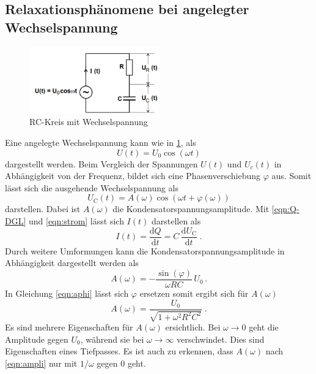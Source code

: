 \subsection{Relaxationsphänomene bei angelegter Wechselspannung}
\begin{figure}
    \centering
    \caption{RC-Kreis mit Wechselspannung} 
    \label{fig:Wechs}
    \includegraphics[width = 0.5\textwidth]{pics/wechselspannung-RC.png}
\end{figure}
Eine angelegte Wechselspannung kann wie in \ref{fig:Wechs}, als 
\begin{equation*}
    U(t)=U_0 \cos(\omega t)
\end{equation*}
dargestellt werden. Beim Vergleich der Spannungen $U(t)$ und $U_c(t)$ in Abhängigkeit von der Frequenz, bildet sich eine Phasenverschiebung $\varphi$ aus.
Somit lässt sich die ausgehende Wechselspannung als
\begin{equation}
    U_\text{C}(t)= A(\omega) \cos (\omega t + \varphi (\omega))
\end{equation}
darstellen. Dabei ist $A(\omega)$ die Kondensatorspannungsamplitude.
Mit \eqref{eqn:Q-DGL} und \eqref{eqn:strom} lässt sich $I(t)$ darstellen als
\begin{equation}
    \label{eqn:strom}
    I(t)= \frac{\text{d}Q}{\text{d}t}=C\, \frac{\text{d}U_\text{C}}{\text{d}t}\; \text{.}
\end{equation}
Durch weitere Umformungen kann die Kondensatorspannungsamplitude in Abhängigkeit dargestellt werden als 
\begin{equation}
    \label{eqn:aphi}
    A(\omega)=-\frac{\sin (\varphi)}{\omega RC}\, U_0 \, .
\end{equation}
In Gleichung \eqref{eqn:aphi} lässt sich $\varphi$ ersetzen somit ergibt sich für $A(\omega)$
\begin{equation}
    \label{eqn:ampli}
    A(\omega)=\frac{U_0}{\sqrt{1+\omega^2 R^2 C^2}} \; \text{.}
\end{equation}
Es sind mehrere Eigenschaften für $A(\omega)$ ersichtlich. Bei $\omega \rightarrow 0$ geht die Amplitude gegen $U_0$, während sie bei 
$\omega \rightarrow \infty$ verschwindet. Dies sind Eigenschaften eines Tiefpasses. Es ist auch zu erkennen, dass $A(\omega)$ nach \eqref{eqn:ampli}
nur mit $1/\omega$ gegen $0$ geht.
